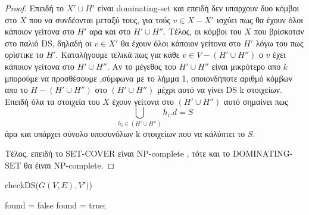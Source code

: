 \documentclass{article}
\begin{document}
\begin{proof}
			Eπειδή το $X'\cup H'$ είναι dominating-set και επειδή δεν υπαρχουν δυο κόμβοι στο $X$ που να συνδέονται μεταξύ τους, για τούς $v \in X - X'$
			ισχύει πως θα έχουν όλοι κάποιον γείτονα στο $H'$ αρα και στο $ H' \cup H''$. Τέλος, οι κόμβοι του $X$ που βρίσκοταν στο παλιό DS, δηλαδή οι 
			$v \in X'$ θα έχουν όλοι κάποιον γείτονα στο $H'$ λόγω του πως ορίστικε το $H'$. Καταλήγουμε τελικά πως για κάθε $v \in V -(H' \cup H'')$ ο $v$
			έχει κάποιον γείτονα στο $H' \cup H''$. Αν το μέγεθος του $H' \cup H''$ είναι μικρότερο απο $k$ μπορούμε να προσθέσουμε ,σύμφωνα με το λήμμα 1,
			οποιονδήποτε αριθμό κόμβων απο το $H-(H' \cup H'')$ στο $(H' \cup H'')$ μέχρι αυτό να γίνει DS k στοιχείων.\\
			Επειδή όλα τα στοιχεία του $X$ έχουν γείτονα στο  $(H' \cup H'')$ αυτό σημαίνει πως $$\bigcup_{h_i \in (H' \cup H'')}h_i.d = S$$ άρα και υπάρχει
			σύνολο υποσυνόλων k στοιχείων που να κάλύπτει το $S$.
 			
	Τέλος, επειδή το SET-COVER είναι NP-complete , τότε και το DOMINATING-SET θα έιναι NP-complete.
	\end{proof}
\begin{algorithm}
		\caption{checkDS($G(V,E),V')$)}
		\label{s}
		\begin{algorithmic}[1]
				\STATE found = false
						\STATE found = true;
					\ENDIF
				\ENDFOR
				\ENDIF
			\ENDFOR 
		\end{algorithmic}
		\end{algorithm}
\end{document}
